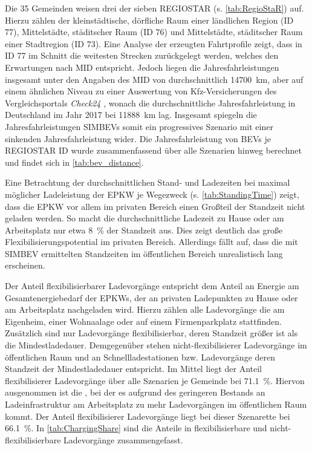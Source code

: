 Die \num{35} Gemeinden weisen drei der sieben \gls{REGIOSTAR} (s. \autoref{tab:RegioStaR}) auf.
Hierzu zählen der kleinstädtische, dörfliche Raum einer ländlichen Region (\gls{ID} \num{77}), Mittelstädte, städitscher Raum (\gls{ID} \num{76}) und Mittelstädte, städitscher Raum einer Stadtregion (\gls{ID} \num{73}).
Eine Analyse der erzeugten Fahrtprofile zeigt, dass in \gls{ID} \num{77} im Schnitt die weitesten Strecken zurückgelegt werden, welches den Erwartungen nach \gls{MID} \cite{Nobis2019} entspricht.
Jedoch liegen die Jahresfahrleistungen insgesamt unter den Angaben des \gls{MID} von durchschnittlich \SI{14700}{\km}, aber auf einem ähnlichen Niveau zu einer Auswertung von Kfz-Versicherungen des Vergleichsportals \textit{Check24} \cite{CHECK24GmbH2018}, wonach die durchschnittliche Jahresfahrleistung in Deutschland im Jahr \num{2017} bei \SI{11888}{\km} lag.
Insgesamt spiegeln die Jahresfahrleistungen \glspl{SIMBEV} somit ein progressives Szenario mit einer sinkenden Jahresfahrleistung wider.
Die Jahresfahrleistung von \glspl{BEV} je \gls{REGIOSTAR} \gls{ID} wurde zusammenfassend über alle Szenarien hinweg berechnet und findet sich in \autoref{tab:bev_distance}.



Eine Betrachtung der durchschnittlichen Stand- und Ladezeiten bei maximal möglicher Ladeleistung der \gls{EPKW} je Wegezweck (s. \autoref{tab:StandingTime}) zeigt, dass die \gls{EPKW} vor allem im privaten Bereich einen Großteil der Standzeit nicht geladen werden.
So macht die durchschnittliche Ladezeit zu Hause oder am Arbeitsplatz nur etwa \SI{8}{\percent} der Standzeit aus.
Dies zeigt deutlich das große Flexibilisierungspotential im privaten Bereich.
Allerdings fällt auf, dass die mit \gls{SIMBEV} ermittelten Standzeiten im öffentlichen Bereich unrealistisch lang erscheinen.



Der Anteil flexibilisierbarer Ladevorgänge entspricht dem Anteil an Energie am Gesamtenergiebedarf der \glspl{EPKW}, der an privaten Ladepunkten zu Hause oder am Arbeitsplatz nachgeladen wird.
Hierzu zählen alle Ladevorgänge die am Eigenheim, einer Wohnaalage oder auf einem Firmenparkplatz stattfinden.
Zusätzlich sind nur Ladevorgänge flexibilisierbar, deren Standzeit größer ist als die Mindestladedauer.
Demgegenüber stehen nicht-flexibilisierer Ladevorgänge im öffentlichen Raum und an Schnellladestationen bzw. Ladevorgänge deren Standzeit der Mindestladedauer entspricht.
Im Mittel liegt der Anteil flexibilisierer Ladevorgänge über alle Szenarien je Gemeinde bei \SI{71.1}{\percent}.
Hiervon ausgenommen ist die \SzeFirmenparkplatzdot, bei der es aufgrund des geringeren Bestands an Ladeinfrastruktur am Arbeitsplatz zu mehr Ladevorgängen im öffentlichen Raum kommt.
Der Anteil flexibilisierer Ladevorgänge liegt bei dieser Szenarette bei \SI{66.1}{\percent}.
In \autoref{tab:ChargingShare} sind die Anteile in flexibilisierbare und nicht-flexibilisierbare Ladevorgänge zusammengefasst.

